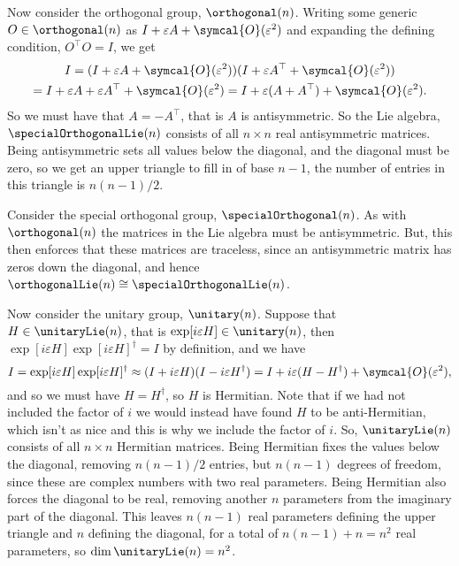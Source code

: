 \documentclass[fleqn]{NotesClass}
\newcommand{\isomorphic}{\cong}
\newcommand{\hermit}{\dagger}
\newcommand{\trans}{\top}
\newcommand{\order}{\symcal{O}}
\begin{document}
    Now consider the orthogonal group, \(\orthogonal(n)\).
    Writing some generic \(O \in \orthogonal(n)\) as \(I + \varepsilon A + \order(\varepsilon^2)\) and expanding the defining condition, \(O^\trans O = I\), we get
    \begin{multline}
        I = (I + \varepsilon A + \order(\varepsilon^2)) (I + \varepsilon A^\trans + \order(\varepsilon^2))\\
        = I + \varepsilon A + \varepsilon A^\trans + \order(\varepsilon^2) = I + \varepsilon(A + A^\trans) + \order(\varepsilon^2).
    \end{multline}
    So we must have that \(A = -A^{\trans}\), that is \(A\) is antisymmetric.
    So the Lie algebra, \(\specialOrthogonalLie(n)\) consists of all \(n \times n\) real antisymmetric matrices.
    Being antisymmetric sets all values below the diagonal, and the diagonal must be zero, so we get an upper triangle to fill in of base \(n - 1\), the number of entries in this triangle is \(n(n - 1)/2\).
    
    Consider the special orthogonal group, \(\specialOrthogonal(n)\).
    As with \(\orthogonal(n)\) the matrices in the Lie algebra must be antisymmetric.
    But, this then enforces that these matrices are traceless, since an antisymmetric matrix has zeros down the diagonal, and hence \(\orthogonalLie(n) \isomorphic \specialOrthogonalLie(n)\).
    
    Now consider the unitary group, \(\unitary(n)\).
    Suppose that \(H \in \unitaryLie(n)\), that is \(\exp[i\varepsilon H] \in \unitary(n)\), then \(\exp[i\varepsilon H]\exp[i\varepsilon H]^\hermit = I\) by definition, and we have
    \begin{equation}
        I = \exp[i\varepsilon H]\exp[i\varepsilon H]^\hermit \approx (I + i\varepsilon H)(I - i\varepsilon H^\hermit) = I + i\varepsilon(H - H^\hermit) + \order(\varepsilon^2),
    \end{equation}
    and so we must have \(H = H^\hermit\), so \(H\) is Hermitian.
    Note that if we had not included the factor of \(i\) we would instead have found \(H\) to be anti-Hermitian, which isn't as nice and this is why we include the factor of \(i\).
    So, \(\unitaryLie(n)\) consists of all \(n \times n\) Hermitian matrices.
    Being Hermitian fixes the values below the diagonal, removing \(n(n - 1)/2\) entries, but \(n(n - 1)\) degrees of freedom, since these are complex numbers with two real parameters.
    Being Hermitian also forces the diagonal to be real, removing another \(n\) parameters from the imaginary part of the diagonal.
    This leaves \(n(n - 1)\) real parameters defining the upper triangle and \(n\) defining the diagonal, for a total of \(n(n - 1) + n = n^2\) real parameters, so \(\dim \unitaryLie(n) = n^2\).
    
\end{document}
